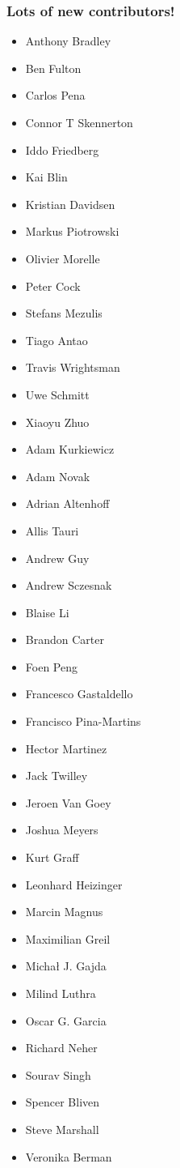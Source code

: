 \documentclass[trans]{beamer}
\begin{document}
\frame
{
  \frametitle{Lots of new contributors!}

  \scriptsize{
  \begin{multicols}{3}
  \begin{itemize}
  \item Anthony Bradley
  \item Ben Fulton
  \item Carlos Pena
  \item Connor T Skennerton
  \item Iddo Friedberg
  \item Kai Blin
  \item Kristian Davidsen
  \item Markus Piotrowski
  \item Olivier Morelle
  \item Peter Cock
  \item Stefans Mezulis
  \item Tiago Antao
  \item Travis Wrightsman
  \item Uwe Schmitt
  \item Xiaoyu Zhuo

  \item Adam Kurkiewicz
  \item Adam Novak
  \item Adrian Altenhoff
  \item Allis Tauri
  \item Andrew Guy
  \item Andrew Sczesnak
  \item Blaise Li
  \item Brandon Carter
  \item Foen Peng
  \item Francesco Gastaldello
  \item Francisco Pina-Martins
  \item Hector Martinez
  \item Jack Twilley
  \item Jeroen Van Goey
  \item Joshua Meyers
  \item Kurt Graff
  \item Leonhard Heizinger
  \item Marcin Magnus
  \item Maximilian Greil
  \item Michał J. Gajda
  \item Milind Luthra
  \item Oscar G. Garcia
  \item Richard Neher
  \item Sourav Singh
  \item Spencer Bliven
  \item Steve Marshall
  \item Veronika Berman
  \end{itemize}
  \end{multicols}
  }
}
\end{document}
